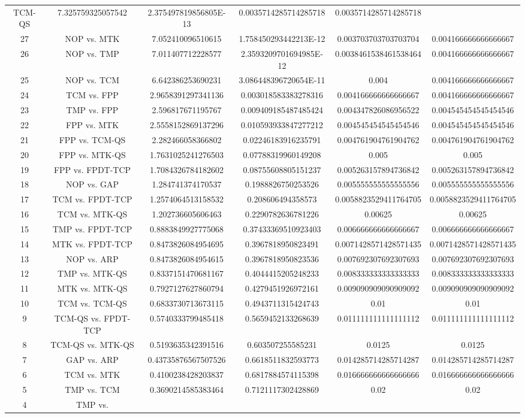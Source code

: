 \documentclass[a4paper,10pt]{article}
\begin{document}
\begin{landscape}
\begin{table}[!htp]
\begin{tabular}{cccccc}
TCM-QS&7.325759325057542&2.375497819856805E-13&0.0035714285714285718&0.0035714285714285718\\27&NOP vs. MTK&7.052410096510615&1.758450293442213E-12&0.003703703703703704&0.004166666666666667\\26&NOP vs. TMP&7.011407712228577&2.3593209701694985E-12&0.0038461538461538464&0.004166666666666667\\25&NOP vs. TCM&6.642386253690231&3.086448396720654E-11&0.004&0.004166666666666667\\24&TCM vs. FPP&2.9658391297341136&0.003018583383278316&0.004166666666666667&0.004166666666666667\\23&TMP vs. FPP&2.596817671195767&0.009409185487485424&0.004347826086956522&0.004545454545454546\\22&FPP vs. MTK&2.5558152869137296&0.010593933847277212&0.004545454545454546&0.004545454545454546\\21&FPP vs. TCM-QS&2.282466058366802&0.02246183916235791&0.004761904761904762&0.004761904761904762\\20&FPP vs. MTK-QS&1.7631025241276503&0.07788319960149208&0.005&0.005\\19&FPP vs. FPDT-TCP&1.7084326784182602&0.08755608805151237&0.005263157894736842&0.005263157894736842\\18&NOP vs. GAP&1.284741374170537&0.1988826750253526&0.005555555555555556&0.005555555555555556\\17&TCM vs. FPDT-TCP&1.2574064513158532&0.208606494358573&0.0058823529411764705&0.0058823529411764705\\16&TCM vs. MTK-QS&1.202736605606463&0.2290782636781226&0.00625&0.00625\\15&TMP vs. FPDT-TCP&0.8883849927775068&0.37433369510923403&0.006666666666666667&0.006666666666666667\\14&MTK vs. FPDT-TCP&0.8473826084954695&0.3967818950823491&0.0071428571428571435&0.0071428571428571435\\13&NOP vs. ARP&0.8473826084954615&0.3967818950823536&0.007692307692307693&0.007692307692307693\\12&TMP vs. MTK-QS&0.8337151470681167&0.4044415205248233&0.008333333333333333&0.008333333333333333\\11&MTK vs. MTK-QS&0.7927127627860794&0.4279451926972161&0.009090909090909092&0.009090909090909092\\10&TCM vs. TCM-QS&0.6833730713673115&0.4943711315424743&0.01&0.01\\9&TCM-QS vs. FPDT-TCP&0.5740333799485418&0.5659452133268639&0.011111111111111112&0.011111111111111112\\8&TCM-QS vs. MTK-QS&0.5193635342391516&0.603507255585231&0.0125&0.0125\\7&GAP vs. ARP&0.43735876567507526&0.6618511832593773&0.014285714285714287&0.014285714285714287\\6&TCM vs. MTK&0.4100238428203837&0.6817884574115398&0.016666666666666666&0.016666666666666666\\5&TMP vs. TCM&0.3690214585383464&0.7121117302428869&0.02&0.02\\4&TMP vs. 
\end{tabular}
\end{table}
\end{landscape}
\end{document}
